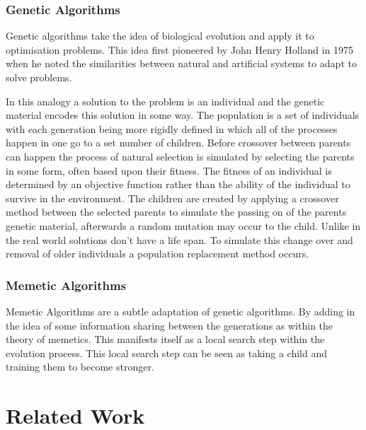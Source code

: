 \documentclass[a4paper]{article}
\begin{document}
\subsubsection{Genetic Algorithms}
Genetic algorithms take the idea of biological evolution and apply it to optimisation problems.
This idea first pioneered by John Henry Holland in 1975 when he noted the similarities between natural and artificial systems to adapt to solve problems.
\par
In this analogy a solution to the problem is an individual and the genetic material encodes this solution in some way.
The population is a set of individuals with each generation being more rigidly defined in which all of the processes happen in one go to a set number of children.
Before crossover between parents can happen the process of natural selection is simulated by selecting the parents in some form, often based upon their fitness.
The fitness of an individual is determined by an objective function rather than the ability of the individual to survive in the environment.
The children are created by applying a crossover method between the selected parents to simulate the passing on of the parents genetic material, afterwards a random mutation may occur to the child.
Unlike in the real world solutions don't have a life span.
To simulate this change over and removal of older individuals a population replacement method occurs.
\subsubsection{Memetic Algorithms}
Memetic Algorithms are a subtle adaptation of genetic algorithms.
By adding in the idea of some information sharing between the generations as within the theory of memetics.
This manifests itself as a local search step within the evolution process.
This local search step can be seen as taking a child and training them to become stronger.

\section{Related Work}
\end{document}
